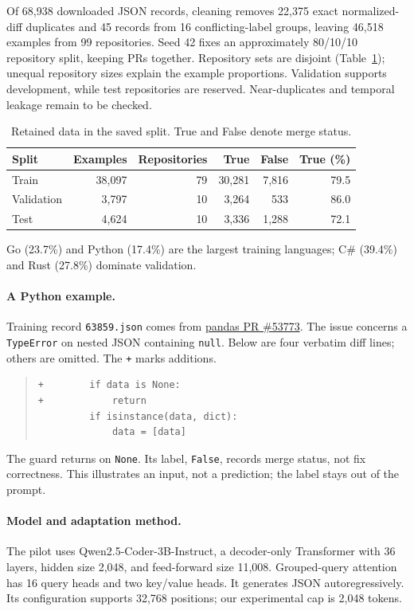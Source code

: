 \documentclass{article}
\begin{document}
Of 68,938 downloaded JSON records, cleaning removes 22,375 exact normalized-diff duplicates and 45 records from 16 conflicting-label groups, leaving 46,518 examples from 99 repositories. Seed 42 fixes an approximately 80/10/10 repository split, keeping PRs together. Repository sets are disjoint (Table~\ref{tab:data}); unequal repository sizes explain the example proportions. Validation supports development, while test repositories are reserved. Near-duplicates and temporal leakage remain to be checked.

\begin{table}[ht]
\caption{Retained data in the saved split. True and False denote merge status.}
\label{tab:data}
\centering
\begin{tabular}{lrrrrr}
\toprule
Split & Examples & Repositories & True & False & True (\%)\\
\midrule
Train & 38,097 & 79 & 30,281 & 7,816 & 79.5\\
Validation & 3,797 & 10 & 3,264 & 533 & 86.0\\
Test & 4,624 & 10 & 3,336 & 1,288 & 72.1\\
\bottomrule
\end{tabular}
\end{table}

Go (23.7\%) and Python (17.4\%) are the largest training languages; C\# (39.4\%) and Rust (27.8\%) dominate validation.

\paragraph{A Python example.}
Training record \texttt{63859.json} comes from
\href{https://github.com/pandas-dev/pandas/pull/53773}{pandas PR \#53773}.
The issue concerns a \texttt{TypeError} on nested JSON containing \texttt{null}.
Below are four verbatim diff lines; others are omitted. The \texttt{+} marks additions.
\begin{quote}
\begin{verbatim}
+        if data is None:
+            return
         if isinstance(data, dict):
             data = [data]
\end{verbatim}
\end{quote}
The guard returns on \texttt{None}. Its label, \texttt{False}, records merge status, not fix correctness. This illustrates an input, not a prediction; the label stays out of the prompt.

\paragraph{Model and adaptation method.}
The pilot uses Qwen2.5-Coder-3B-Instruct, a decoder-only Transformer with 36 layers, hidden size 2,048, and feed-forward size 11,008. Grouped-query attention has 16 query heads and two key/value heads. It generates JSON autoregressively. Its configuration supports 32,768 positions; our experimental cap is 2,048 tokens.
\end{document}
